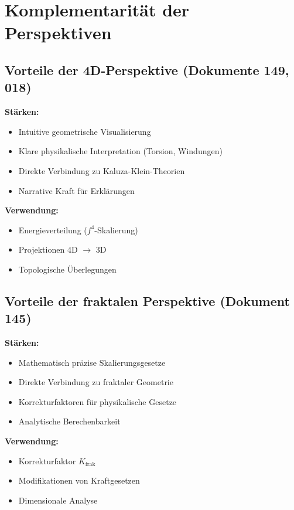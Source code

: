 	\section{Komplementarität der Perspektiven}
	
	\subsection{Vorteile der 4D-Perspektive (Dokumente 149, 018)}
	
	\textbf{Stärken:}
	\begin{itemize}
		\item Intuitive geometrische Visualisierung
		\item Klare physikalische Interpretation (Torsion, Windungen)
		\item Direkte Verbindung zu Kaluza-Klein-Theorien
		\item Narrative Kraft für Erklärungen
	\end{itemize}
	
	\textbf{Verwendung:}
	\begin{itemize}
		\item Energieverteilung ($f^4$-Skalierung)
		\item Projektionen 4D $\to$ 3D
		\item Topologische Überlegungen
	\end{itemize}
	
	\subsection{Vorteile der fraktalen Perspektive (Dokument 145)}
	
	\textbf{Stärken:}
	\begin{itemize}
		\item Mathematisch präzise Skalierungsgesetze
		\item Direkte Verbindung zu fraktaler Geometrie
		\item Korrekturfaktoren für physikalische Gesetze
		\item Analytische Berechenbarkeit
	\end{itemize}
	
	\textbf{Verwendung:}
	\begin{itemize}
		\item Korrekturfaktor $K_{\text{frak}}$
		\item Modifikationen von Kraftgesetzen
		\item Dimensionale Analyse
	\end{itemize}
	
